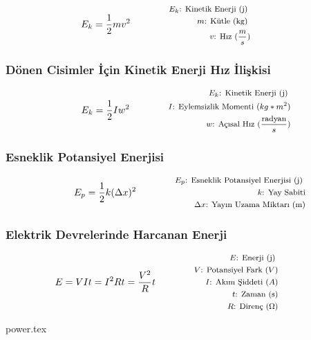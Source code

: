 \begin{equation}
    E_k = \frac{1}{2} m v^2 \qquad \qquad \parbox{4cm}{\footnotesize$\begin{aligned}
        E_k\text{: Kinetik  Enerji (j) } \\
        m\text{: Kütle (kg) } \\ 
        v\text{: Hız } (\frac{m}{s})
    \end{aligned}$}
\end{equation}

\subsubsection*{Dönen Cisimler İçin Kinetik Enerji Hız İlişkisi}

\begin{equation}
    E_k = \frac{1}{2} I w^2 \qquad \qquad \parbox{4cm}{\footnotesize$\begin{aligned}
        E_k\text{: Kinetik  Enerji (j) } \\
        I\text{: Eylemsizlik Momenti (} kg*m^2\text{)} \\
        w\text{: Açısal Hız } (\frac{\text{radyan}}{s})
    \end{aligned}$}
\end{equation}

\subsubsection*{Esneklik Potansiyel Enerjisi}
\begin{equation}
    E_p = \frac{1}{2}k(\Delta x)^2 \qquad \qquad \parbox{4cm}{\footnotesize$\begin{aligned}
        E_p\text{: Esneklik Potansiyel Enerjisi (j) } \\
        k\text{: Yay Sabiti} \\
        \Delta x\text{: Yayın Uzama Miktarı (m)}
\end{aligned}$}
\end{equation}

\subsubsection*{Elektrik Devrelerinde Harcanan Enerji}
\begin{equation}
    E = VIt = I^2Rt = \frac{V^2}{R}t \qquad \qquad \parbox{4cm}{\footnotesize$\begin{aligned}
        E\text{: Enerji (j) } \\
        V\text{: Potansiyel Fark } (V) \\
        I\text{: Akım Şiddeti } (A) \\
        t\text{: Zaman (s)} \\
        R\text{: Direnç } (\Omega)
\end{aligned}$}
\end{equation}

{power.tex}
